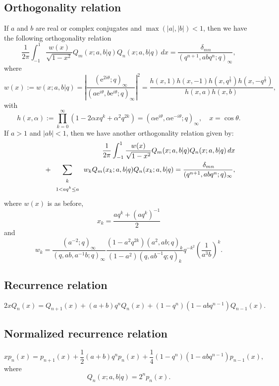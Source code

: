 \documentclass[envcountchap,graybox]{svmono}
\newcommand{\mathindent}{\hspace{7.5mm}}
\newcommand{\e}{\textrm{e}}
\begin{document}
\subsection*{Orthogonality relation}
If $a$ and $b$ are real or complex conjugates and $\max(|a|,|b|)<1$, then we have the following orthogonality relation
\begin{equation}
\label{OrtAlSalamChiharaI}
\frac{1}{2\pi}\int_{-1}^1\frac{w(x)}{\sqrt{1-x^2}}Q_m(x;a,b|q)Q_n(x;a,b|q)\,dx
=\frac{\,\delta_{mn}}{(q^{n+1},abq^n;q)_{\infty}},
\end{equation}
where
$$w(x):=w(x;a,b|q)=\left|\frac{(\e^{2i\theta};q)_{\infty}}
{(a\e^{i\theta},b\e^{i\theta};q)_{\infty}}\right|^2
=\frac{h(x,1)h(x,-1)h(x,q^{\frac{1}{2}})h(x,-q^{\frac{1}{2}})}{h(x,a)h(x,b)},$$
with
$$h(x,\alpha):=\prod_{k=0}^{\infty}\left(1-2\alpha xq^k+\alpha^2q^{2k}\right)
=\left(\alpha\e^{i\theta},\alpha\e^{-i\theta};q\right)_{\infty},\quad x=\cos\theta.$$
If $a>1$ and $|ab|<1$, then we have another orthogonality relation given by:
\begin{eqnarray}
\label{OrtAlSalamChiharaII}
& &\frac{1}{2\pi}\int_{-1}^1\frac{w(x)}{\sqrt{1-x^2}}Q_m(x;a,b|q)Q_n(x;a,b|q)\,dx\nonumber\\
& &{}\mathindent{}+\sum_{\begin{array}{c}\scriptstyle k\\ \scriptstyle 1<aq^k\leq a\end{array}}
w_kQ_m(x_k;a,b|q)Q_n(x_k;a,b|q)=\frac{\,\delta_{mn}}{(q^{n+1},abq^n;q)_{\infty}},
\end{eqnarray}
where $w(x)$ is as before,
$$x_k=\frac{aq^k+\left(aq^k\right)^{-1}}{2}$$
and
$$w_k=\frac{(a^{-2};q)_{\infty}}{(q,ab,a^{-1}b;q)_{\infty}}
\frac{(1-a^2q^{2k})(a^2,ab;q)_k}{(1-a^2)(q,ab^{-1}q;q)_k}
q^{-k^2}\left(\frac{1}{a^3b}\right)^k.$$

\subsection*{Recurrence relation}
\begin{equation}
\label{RecAlSalamChihara}
2xQ_n(x)=Q_{n+1}(x)+(a+b)q^nQ_n(x)+(1-q^n)(1-abq^{n-1})Q_{n-1}(x).
\end{equation}

\subsection*{Normalized recurrence relation}
\begin{equation}
\label{NormRecAlSalamChihara}
xp_n(x)=p_{n+1}(x)+\frac{1}{2}(a+b)q^np_n(x)+\frac{1}{4}(1-q^n)(1-abq^{n-1})p_{n-1}(x),
\end{equation}
where
$$Q_n(x;a,b|q)=2^np_n(x).$$
\end{document}
